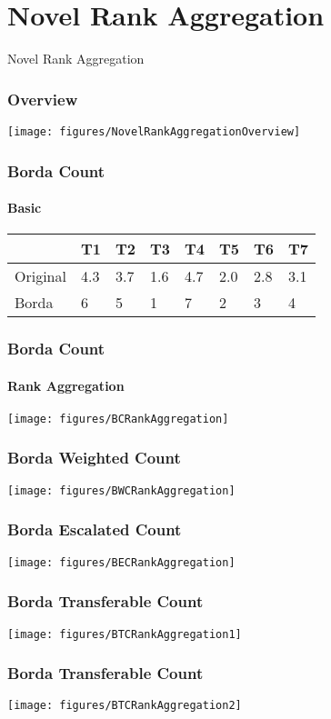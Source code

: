 \section{Novel Rank Aggregation}

\begin{frame}
	\begin{center}
		\huge Novel Rank Aggregation
	\end{center}
\end{frame}

\begin{frame}
	\frametitle{Overview}
	\centering
	\texttt{[image: figures/NovelRankAggregationOverview]}
\end{frame}

\begin{frame}
	\frametitle{Borda Count}
	\framesubtitle{Basic}
	\centering
	\begin{tabular}{|l|l|l|l|l|l|l|l|}
		\hline
		& T1  & T2  & T3  & T4  & T5  & T6  & T7  \\ \hline
		Original & 4.3 & 3.7 & 1.6 & 4.7 & 2.0 & 2.8 & 3.1 \\ \hline
		Borda    & 6   & 5   & 1   & 7   & 2   & 3   & 4   \\ \hline
	\end{tabular}
\end{frame}

\begin{frame}
	\frametitle{Borda Count}
	\framesubtitle{Rank Aggregation}
	\centering
	\texttt{[image: figures/BCRankAggregation]}
\end{frame}

\begin{frame}
	\frametitle{Borda Weighted Count}
	\centering
	\texttt{[image: figures/BWCRankAggregation]}
\end{frame}

\begin{frame}
	\frametitle{Borda Escalated Count}
	\centering
	\texttt{[image: figures/BECRankAggregation]}
\end{frame}

\begin{frame}
	\frametitle{Borda Transferable Count}
	\centering
	\texttt{[image: figures/BTCRankAggregation1]}
\end{frame}

\begin{frame}
	\frametitle{Borda Transferable Count}
	\centering
	\texttt{[image: figures/BTCRankAggregation2]}
\end{frame}

